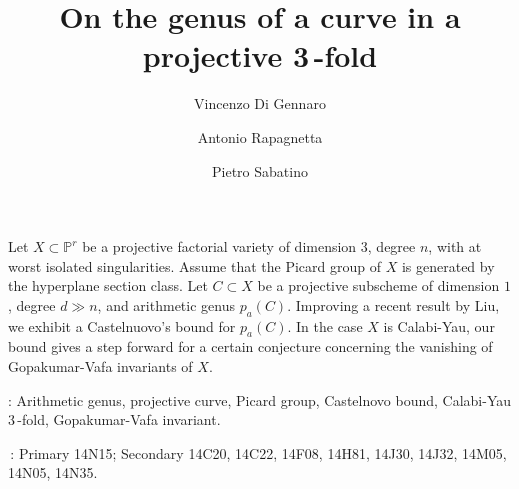 \documentclass[9pt,a4paper]{amsart}
\theoremstyle{plain}
\theoremstyle{definition}
\theoremstyle{remark}
\begin{document}
\title[On the genus of a curve in a projective 3\,-fold]
{On the genus of a curve in a projective 3\,-fold}


\author{Vincenzo Di Gennaro }
\address{Universit\`a di Roma \lq\lq Tor Vergata\rq\rq, Dipartimento di Matematica,
Via della Ricerca Scientifica, 00133 Roma, Italy.}



\author{Antonio Rapagnetta}
\address{Universit\`a di Roma \lq\lq Tor Vergata\rq\rq, Dipartimento di Matematica,
Via della Ricerca Scientifica, 00133 Roma, Italy.}



\author{Pietro Sabatino}
\address{Institute for high performance computing and networking (ICAR-CNR),
via P. Bucci 8/9C 87036 Rende (CS), Italy.}





\abstract Let $X\subset \mathbb P^r$ be a projective factorial
variety of dimension $3$, degree $n$, with at worst isolated
singularities. Assume that the Picard group of $X$ is generated by
the hyperplane section class. Let $C\subset X$ be a projective
subscheme of dimension $1$, degree $d\gg n$, and arithmetic genus
$p_a(C)$. Improving a recent result by Liu, we exhibit a Castelnuovo's
bound for $p_a(C)$. In the case $X$ is Calabi-Yau, our bound gives a
step forward for a certain conjecture concerning the vanishing of
Gopakumar-Vafa invariants of $X$.






\bigskip{}: Arithmetic genus, projective
curve, Picard group, Castelnovo bound, Calabi-Yau 3\,-fold,
Gopakumar-Vafa invariant.

\medskip{}\,: Primary 14N15;
Secondary 14C20, 14C22, 14F08, 14H81, 14J30, 14J32, 14M05, 14N05,
14N35.

\endabstract
\maketitle
\end{document}
